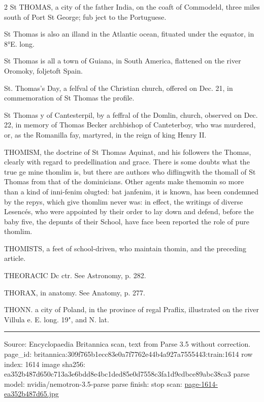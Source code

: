 \documentclass[10pt]{article}
\begin{document}
\begin{multicols}{2}
St THOMAS, a city of the father India, on the coaft of Commodeld, three miles south of Port St George; fub ject to the Portuguese.

St Thomas is also an illand in the Atlantic ocean, fituated under the equator, in 8°E. long.

St Thomas is all a town of Guiana, in South America, flattened on the river Oromoky, foljetoft Spain.

St. Thomas’s Day, a felfval of the Christian church, offered on Dec. 21, in commemoration of St Thomas the profile.

St Thomas y of Cantesterpil, by a feffral of the Domlin, church, observed on Dec. 22, in memory of Thomas Becker archbishop of Canteterboy, who was murdered, or, as the Romanilla fay, martyred, in the reign of king Henry II.

THOMISM, the doctrine of St Thomas Aquinat, and his followers the Thomas, clearly with regard to predellination and grace. There is some doubts what the true ge mine thomlim is, but there are authors who diflingwith the thomall of St Thomas from that of the dominicians. Other agents make themomin so more than a kind of inni-fenim olugted: bat janfenim, it is known, has been condemned by the repys, which give thomlim never was: in effect, the writings of diverse Lesencés, who were appointed by their order to lay down and defend, before the baby five, the depunts of their School, have face been reported the role of pure thomlim.

THOMISTS, a feet of school-driven, who maintain thomin, and the preceding article.

THEORACIC Dc ctr. See Astronomy, p. 282.

THORAX, in anatomy. See Anatomy, p. 277.

THONN. a city of Poland, in the province of regal Praflix, illustrated on the river Villula e. E. long. 19", and N. lat.

\end{multicols}
\vfill\par\noindent\rule{\linewidth}{0.4pt}\par
{\scriptsize\color{gray}\noindent Source: Encyclopaedia Britannica scan, text from Parse 3.5 without correction. page\_id: britannica:309f765b1ecc83e0a7f7762e44b4a927a7555443:train:1614 \quad row index: 1614 \quad image sha256: ea352b487d650c713a3e6bdd8e4bc1ded85e0d7558c3fa1d9cdbce89abc38ca3 \quad parse model: nvidia/nemotron-3.5-parse \quad parse finish: stop \quad scan: \href{../scans/page-1614-ea352b487d65.jpg}{page-1614-ea352b487d65.jpg}\par}
\end{document}
